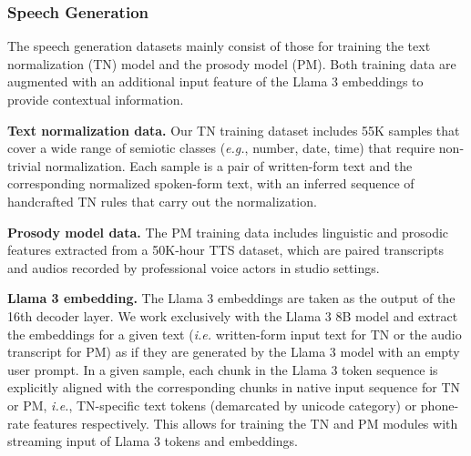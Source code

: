 \subsubsection{Speech Generation}
\label{sec:data:tts}
The speech generation datasets mainly consist of those for training the text normalization (TN) model and the prosody model (PM).  Both training data are augmented with an additional input feature of the Llama 3 embeddings to provide contextual information.

\textbf{Text normalization data.} Our TN training dataset includes 55K samples that cover a wide range of semiotic classes (\emph{e.g.}, number, date, time) that require non-trivial normalization. Each sample is a pair of written-form text and the corresponding normalized spoken-form text, with an inferred sequence of handcrafted TN rules that carry out the normalization.

\textbf{Prosody model data.} The PM training data includes linguistic and prosodic features extracted from a 50K-hour TTS dataset, which are paired transcripts and audios recorded by professional voice actors in studio settings.

\textbf{Llama 3 embedding.}
The Llama 3 embeddings are taken as the output of the 16th decoder layer. We work exclusively with the Llama 3 8B model and extract the embeddings for a given text (\emph{i.e.} written-form input text for TN or the audio transcript for PM) as if they are generated by the Llama 3 model with an empty user prompt. In a given sample, each chunk in the Llama 3 token sequence is explicitly aligned with the corresponding chunks in native input sequence for TN or PM, \emph{i.e.}, TN-specific text tokens (demarcated by unicode category) or phone-rate features respectively. This allows for training the TN and PM modules with streaming input of Llama 3 tokens and embeddings.
